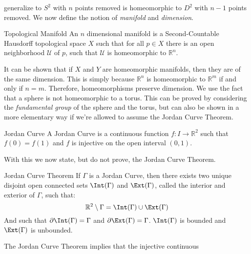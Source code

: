 \documentclass[crop=false,class=book,oneside]{standalone}
\begin{document}
            generalize to $S^{2}$ with $n$ points removed is
            homeomorphic to $D^{2}$ with $n-1$ points removed.
            We now define the notion of
            \textit{manifold} and \textit{dimension}.
            \begin{ldefinition}{Topological Manifold}
                An $n$ dimensional manifold is a Second-Countable
                Hausdorff topological space $X$ such that for all
                $p\in{X}$ there is an open neighborhood
                $\mathcal{U}$ of $p$, such that $\mathcal{U}$
                is homeomorphic to $\mathbb{R}^{n}$.
            \end{ldefinition}
            It can be shown that if $X$ and $Y$ are homeomorphic
            manifolds, then they are of the same dimension.
            This is simply because $\mathbb{R}^{n}$ is homeomorphic
            to $\mathbb{R}^{m}$ if and only if $n=m$. Therefore,
            homeomorphisms preserve dimension. We use the fact that
            a sphere is not homeomorphic to a torus. This can be proved
            by considering the \textit{fundamental group} of
            the sphere and the torus, but can also be shown
            in a more elementary way if we're allowed to assume
            the Jordan Curve Theorem.
            \begin{ldefinition}{Jordan Curve}
                A Jordan Curve is a continuous
                function $f:I\rightarrow\mathbb{R}^{2}$
                such that $f(0)=f(1)$ and $f$ is injective
                on the open interval $(0,1)$.
            \end{ldefinition}
            With this we now state, but do not prove, the Jordan
            Curve Theorem.
            \begin{ftheorem}{Jordan Curve Theorem}{}
                If $\Gamma$ is a Jordan Curve, then there exists
                two unique disjoint open connected sets $\Int(\Gamma)$
                and $\Ext(\Gamma)$, called the interior and exterior of
                $\Gamma$, such that:
                \begin{equation}
                    \mathbb{R}^{2}\setminus\Gamma
                    =\Int(\Gamma)\cup\Ext(\Gamma)
                \end{equation}
                And such that $\partial\Int(\Gamma)=\Gamma$ and
                $\partial\Ext(\Gamma)=\Gamma$. $\Int(\Gamma)$ is
                bounded and $\Ext(\Gamma)$ is unbounded.
            \end{ftheorem}
            The Jordan Curve Theorem implies that the injective continuous
\end{document}

